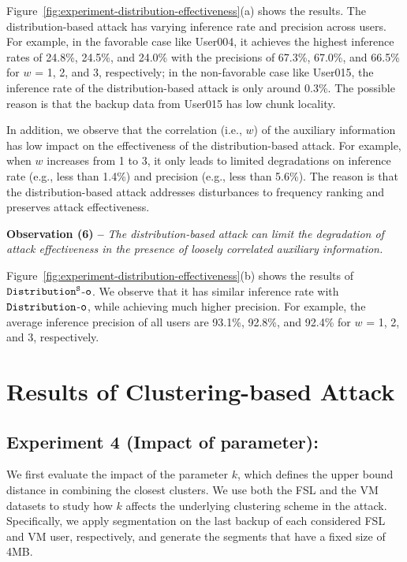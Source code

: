 Figure~\ref{fig:experiment-distribution-effectiveness}(a) shows the results. The
distribution-based attack has varying inference rate and precision  across
users. For example, in the favorable case like User004, it achieves the
highest inference rates of 24.8\%, 24.5\%, and 24.0\% with the precisions of
67.3\%, 67.0\%, and 66.5\% for $w$ = 1, 2, and 3, respectively; in the
non-favorable case like User015, the inference rate of the distribution-based
attack is only around 0.3\%. The possible reason is that the backup data from
User015 has low chunk locality. 

In addition, we observe that the correlation (i.e., $w$) of the auxiliary
information has low impact on the effectiveness of the distribution-based
attack.  For example, when $w$ increases from 1 to 3, it only leads to limited
degradations on inference rate (e.g., less than 1.4\%) and precision (e.g.,
less than 5.6\%). The reason is that the distribution-based attack addresses
disturbances to frequency ranking and preserves attack effectiveness.  

{\bf Observation (6) --} {\em The distribution-based attack can limit the
degradation of attack effectiveness in the presence of loosely correlated
auxiliary information.} 

 Figure~\ref{fig:experiment-distribution-effectiveness}(b) shows the results of $\tt Distribution^S$-$\tt o$. We observe that it has similar inference rate with $\tt Distribution$-$\tt o$,  
 while achieving much higher precision. For example, the average inference precision of all users are 93.1\%, 92.8\%, and 92.4\% for $w$ = 1, 2, and 3, respectively.  



\section{Results of Clustering-based Attack}
\label{sec:experiment-clustering}




\subsection{Experiment 4 (Impact of parameter):} We first evaluate the impact
of the parameter $k$, which defines the upper bound distance
in combining the closest clusters.  We use both the FSL and the VM datasets to
study how $k$ affects the underlying clustering scheme in the attack.
Specifically, we apply segmentation on the last backup of each considered FSL
and VM user, respectively, and generate the segments that have a fixed size of
4MB. 

